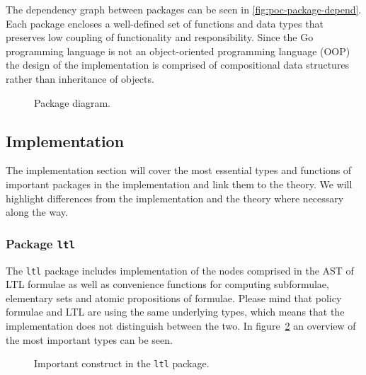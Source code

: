 The dependency graph between packages can be seen in \autoref{fig:poc-package-depend}. Each package encloses a well-defined set of functions and data types that preserves low coupling of functionality and responsibility. Since the Go programming language is not an object-oriented programming language (OOP) the design of the implementation is comprised of compositional data structures rather than inheritance of objects.

\begin{figure}[!ht]
    \centering
    
    \caption{Package diagram.}
    \label{fig:poc-package-depend}
\end{figure}

\subsection{Implementation}
The implementation section will cover the most essential types and functions of important packages in the implementation and link them to the theory. We will highlight differences from the implementation and the theory where necessary along the way.

\subsubsection{Package \texttt{ltl}}
The \texttt{ltl} package includes implementation of the nodes comprised in the AST of LTL formulae as well as convenience functions for computing subformulae, elementary sets and atomic propositions of formulae. Please mind that policy formulae and LTL are using the same underlying types, which means that the implementation does not distinguish between the two. In figure~\ref{fig:poc-ltl-package} an overview of the most important types can be seen.
\begin{figure}[!ht]
    \caption{Important construct in the \texttt{ltl} package.}
    \label{fig:poc-ltl-package}
\end{figure}

